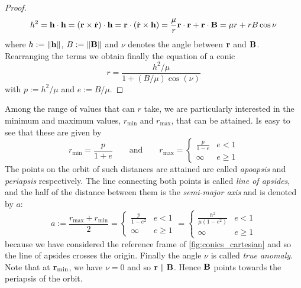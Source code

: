 \documentclass[../main.tex]{subfiles}
\begin{document}
\begin{proof}
  \begin{equation}
    h^2=\boldsymbol{\mathrm{h}}\cdot\boldsymbol{\mathrm{h}}=(\boldsymbol{\mathrm{r}}\times\dot{\boldsymbol{\mathrm{r}}})\cdot\boldsymbol{\mathrm{h}}=\boldsymbol{\mathrm{r}}\cdot(\dot{\boldsymbol{\mathrm{r}}}\times\boldsymbol{\mathrm{h}})=\frac{\mu}{r}\boldsymbol{\mathrm{r}}\cdot\boldsymbol{\mathrm{r}}+\boldsymbol{\mathrm{r}}\cdot\boldsymbol{\mathrm{B}}=\mu r+rB\cos\nu
  \end{equation}
  where $h:=\left\|\boldsymbol{\mathrm{h}}\right\|$, $B:=\left\|\boldsymbol{\mathrm{B}}\right\|$ and $\nu$ denotes the angle between $\boldsymbol{\mathrm{r}}$ and $\boldsymbol{\mathrm{B}}$. Rearranging the terms we obtain finally the equation of a conic
  \begin{equation}\label{eq:r_conic}
    r=\frac{h^2/\mu}{1+(B/\mu)\cos(\nu)}
  \end{equation}
  with $p:=h^2/\mu$ and $e:=B/\mu$.
\end{proof}
Among the range of values that can $r$ take, we are particularly interested in the minimum and maximum values, $r_\mathrm{min}$ and $r_\mathrm{max}$, that can be attained. Is easy to see that these are given by
\begin{equation}
  r_\mathrm{min}=\frac{p}{1+e}\qquad\text{and}\qquad r_\mathrm{max}=
  \begin{cases}
    \displaystyle\frac{p}{1-e} & e<1     \\
    \infty                     & e\geq 1
  \end{cases}
\end{equation}
The points on the orbit of such distances are attained are called \emph{apoapsis} and \emph{periapsis} respectively. The line connecting both points is called \emph{line of apsides}, and the half of the distance between them is the \emph{semi-major axis} and is denoted by $a$:
\begin{equation}\label{eq:semi-major_axis}
  a:=\frac{r_\mathrm{max}+r_\mathrm{min}}{2}=
  \begin{cases}
    \displaystyle\frac{p}{1-e^2} & e<1     \\
    \infty                       & e\geq 1
  \end{cases}=
  \begin{cases}
    \displaystyle\frac{h^2}{\mu(1-e^2)} & e<1     \\
    \infty                              & e\geq 1
  \end{cases}
\end{equation}
because we have considered the reference frame of \cref{fig:conics_cartesian} and so the line of apsides crosses the origin. Finally the angle $\nu$ is called \emph{true anomaly}. Note that at $\boldsymbol{\mathrm{r}}_\mathrm{min}$, we have $\nu=0$ and so $\boldsymbol{\mathrm{r}}\parallel\boldsymbol{\mathrm{B}}$. Hence $\boldsymbol{\mathrm{B}}$ points towards the periapsis of the orbit.
\end{document}
